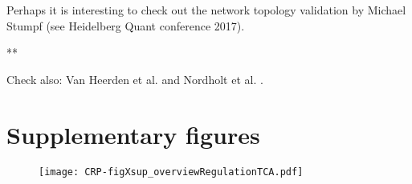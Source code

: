 Perhaps it is interesting to check out the network topology validation by Michael Stumpf (see Heidelberg Quant conference 2017). 

**


Check also:
Van Heerden et al. \cite{VanHeerden2017}
and
Nordholt et al. \cite{Nordholt2017}.


\section*{Supplementary figures}




\begin{figure}%
	\centering
	\texttt{[image: CRP-figXsup\_overviewRegulationTCA.pdf]}
	\clearpage %
	\label{fig:CRP:figOverviewTCARegulation}
\end{figure}	

\clearpage

